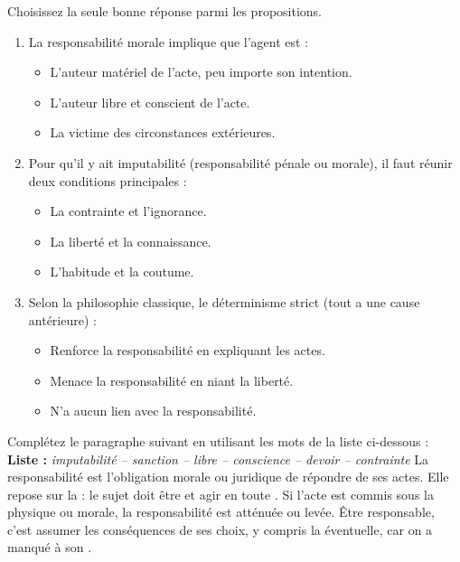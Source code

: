 \documentclass[11pt]{article}
\begin{document}
\begin{exercice}
Choisissez la seule bonne réponse parmi les propositions.
\begin{enumerate}
    \item La responsabilité morale implique que l'agent est :
    \begin{itemize}
        \item[A.] L'auteur matériel de l'acte, peu importe son intention.
        \item[B.] L'auteur libre et conscient de l'acte.
        \item[C.] La victime des circonstances extérieures.
    \end{itemize}
    \item Pour qu'il y ait imputabilité (responsabilité pénale ou morale), il faut réunir deux conditions principales :
    \begin{itemize}
        \item[A.] La contrainte et l'ignorance.
        \item[B.] La liberté et la connaissance.
        \item[C.] L'habitude et la coutume.
    \end{itemize}
    \item Selon la philosophie classique, le déterminisme strict (tout a une cause antérieure) :
    \begin{itemize}
        \item[A.] Renforce la responsabilité en expliquant les actes.
        \item[B.] Menace la responsabilité en niant la liberté.
        \item[C.] N'a aucun lien avec la responsabilité.
    \end{itemize}
\end{enumerate}
\end{exercice}

\begin{exercice}
Complétez le paragraphe suivant en utilisant les mots de la liste ci-dessous :
\medskip
\noindent \textbf{Liste :} \textit{imputabilité -- sanction -- libre -- conscience -- devoir -- contrainte}
\medskip
\noindent La responsabilité est l'obligation morale ou juridique de répondre de ses actes. Elle repose sur la \underline{\hspace{4cm}} : le sujet doit être \underline{\hspace{4cm}} et agir en toute \underline{\hspace{4cm}}. Si l'acte est commis sous la \underline{\hspace{4cm}} physique ou morale, la responsabilité est atténuée ou levée. Être responsable, c'est assumer les conséquences de ses choix, y compris la \underline{\hspace{4cm}} éventuelle, car on a manqué à son \underline{\hspace{4cm}}.
\end{exercice}
\end{document}
